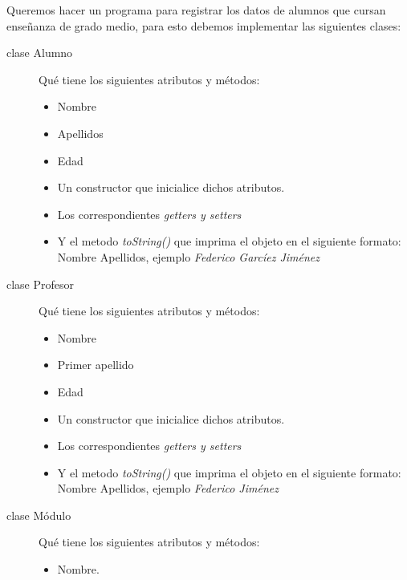 \documentclass[addpoints,12pt]{exam}
\begin{document}
\begin{center}
\end{center}
\vspace{0.1in}
\begin{questions}
\question Queremos hacer un programa para registrar los datos de alumnos que cursan enseñanza de grado medio, para esto debemos implementar las siguientes clases:
\begin{description}
\item[clase Alumno] Qué tiene los siguientes atributos y métodos:
\begin{itemize}
\item Nombre
\item Apellidos
\item Edad
\item Un constructor que inicialice dichos atributos.
\item Los correspondientes \emph{getters y setters}
\item Y el metodo \emph{toString()} que imprima el objeto en el siguiente formato: Nombre Apellidos, ejemplo \emph{Federico Garcíez Jiménez}
\end{itemize}
\item[clase Profesor] Qué tiene los siguientes atributos y métodos:
\begin{itemize}
\item Nombre
\item Primer apellido
\item Edad
\item Un constructor que inicialice dichos atributos.
\item Los correspondientes \emph{getters y setters}
\item Y el metodo \emph{toString()} que imprima el objeto en el siguiente formato: Nombre Apellidos, ejemplo \emph{Federico Jiménez}
\end{itemize}
\item[clase Módulo] Qué tiene los siguientes atributos y métodos:
\begin{itemize}
\item Nombre.

\end{itemize}
\end{description}
\end{questions}
\end{document}
